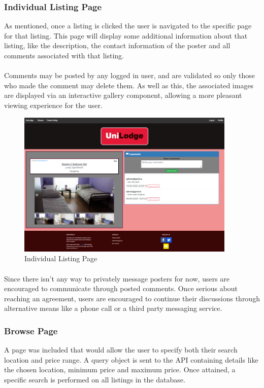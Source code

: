\subsubsection{Individual Listing Page}
As mentioned, once a listing is clicked the user is navigated to the specific page for that listing. This page will display some additional information about that listing, like the description, the contact information of the poster and all comments associated with that listing.

\paragraph{}
Comments may be posted by any logged in user, and are validated so only those who made the comment may delete them. As well as this, the associated images are displayed via an interactive gallery component, allowing a more pleasant viewing experience for the user.

\begin{figure}[H]
	\caption{Individual Listing Page}
	\label{image:home}
	\centering
	\includegraphics[width=0.93\textwidth]{images/indiv_listing.png}
\end{figure}

\paragraph{}
Since there isn't any way to privately message posters for now, users are encouraged to communicate through posted comments. Once serious about reaching an agreement, users are encouraged to continue their discussions through alternative means like a phone call or a third party messaging service.

\subsubsection{Browse Page}
A page was included that would allow the user to specify both their search location and price range. A query object is sent to the API containing details like the chosen location, minimum price and maximum price. Once attained, a specific search is performed on all listings in the database. \newline


